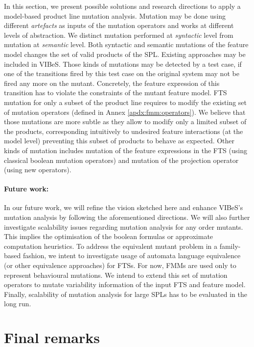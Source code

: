 In this section, we present possible solutions and research directions to apply a model-based product line mutation analysis. Mutation may be done using different \emph{artefacts} as inputs of the mutation operators and works at different levels of abstraction. We distinct mutation performed at \emph{syntactic} level from mutation at \emph{semantic} level. 
%
Both syntactic and semantic mutations of the feature model changes the set of valid products of the SPL. Existing approaches may be included in VIBeS. Those kinds of mutations may be detected by a test case, if one of the transitions fired by this test case on the original system may not be fired any more on the mutant. Concretely, the feature expression of this transition has to violate the constraints of the mutant feature model. 
%
FTS mutation for only a subset of the product line requires to modify the existing set of mutation operators (defined in Annex \ref{apdx:fmm:operators}). We believe that those mutations are more subtle as they allow to modify only a limited subset of the products, corresponding intuitively to undesired feature interactions (at the model level) preventing this subset of products to behave as expected.
%
Other kinds of mutation includes mutation of the feature expressions in the FTS (using classical boolean mutation operators) and mutation of the projection operator (using new operators).

\paragraph{Future work:}

In our future work, we will refine the vision sketched here and enhance VIBeS's mutation analysis by following the aforementioned directions.
We will also further investigate scalability issues regarding mutation analysis for any order mutants. This implies the optimisation of the boolean formulas or approximate computation heuristics. To address the equivalent mutant problem in a family-based fashion, we intent to investigate usage of automata language equivalence (or other equivalence approaches) for FTSs. For now, FMMs are used only to represent behavioural mutations. We intend to extend this set of mutation operators to mutate variability information of the input FTS and feature model. Finally, scalability of mutation analysis for large \glspl{SPL} has to be evaluated in the long run.


\section{Final remarks}

